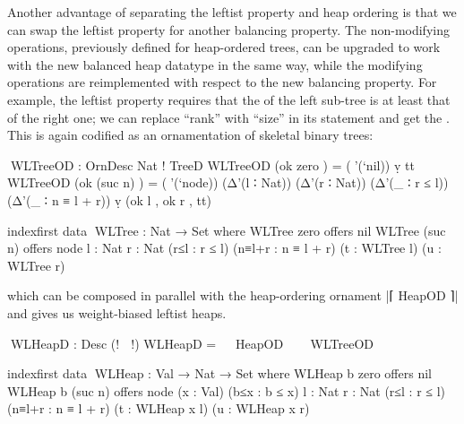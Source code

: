 Another advantage of separating the leftist property and heap ordering is that we can swap the leftist property for another balancing property.
The non-modifying operations, previously defined for heap-ordered trees, can be upgraded to work with the new balanced heap datatype in the same way, while the modifying operations are reimplemented with respect to the new balancing property.
For example, the leftist property requires that the  of the left sub-tree is at least that of the right one; we can replace ``rank'' with ``size'' in its statement and get the .
This is again codified as an ornamentation of skeletal binary trees:
\begin{code}
^^^WLTreeOD : OrnDesc Nat ! TreeD
WLTreeOD (ok zero     )  =  (∇'(`nil)) ṿ tt
WLTreeOD (ok (suc n)  )  =  (∇'(`node)) (Δ'(l ∶ Nat)) (Δ'(r ∶ Nat))
                              (Δ'(_ ∶ r ≤ l)) (Δ'(_ ∶ n ≡ l + r)) ṿ (ok l , ok r , tt)

indexfirst data ^^^WLTree : Nat → Set where
  WLTree zero     offers   nil
  WLTree (suc n)  offers   node  {l : Nat} {r : Nat}
                                 (r≤l : r ≤ l) (n≡l+r : n ≡ l + r)
                                 (t : WLTree l) (u : WLTree r)
\end{code}
which can be composed in parallel with the heap-ordering ornament |⌈ HeapOD ⌉| and gives us weight-biased leftist heaps.
\begin{code}
^^^WLHeapD : Desc (! ⋈ !)
WLHeapD = ⌊ ⌈ HeapOD ⌉ ⊗ ⌈ WLTreeOD ⌉ ⌋

indexfirst data ^^^WLHeap : Val → Nat → Set where
  WLHeap b zero     offers  nil
  WLHeap b (suc n)  offers  node  (x : Val) (b≤x : b ≤ x)
                                  {l : Nat} {r : Nat}
                                  (r≤l : r ≤ l) (n≡l+r : n ≡ l + r)
                                  (t : WLHeap x l) (u : WLHeap x r)
\end{code}

